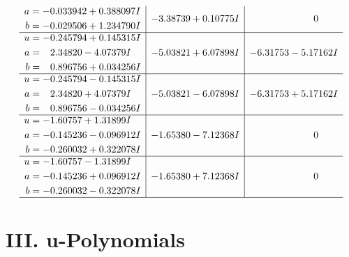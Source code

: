 \documentclass[1p]{elsarticle_modified}
\theoremstyle{definition}
\begin{document}
$$\begin{array}{c|c|c}
\begin{aligned}
a &= -0.033942 + 0.388097 I \\
b &= -0.029506 + 1.234790 I\end{aligned}
 & -3.38739 + 0.10775 I & \phantom{-0.000000 } 0 \\ \hline\begin{aligned}
u &= -0.245794 + 0.145315 I \\
a &= \phantom{-}2.34820 - 4.07379 I \\
b &= \phantom{-}0.896756 + 0.034256 I\end{aligned}
 & -5.03821 + 6.07898 I & -6.31753 - 5.17162 I \\ \hline\begin{aligned}
u &= -0.245794 - 0.145315 I \\
a &= \phantom{-}2.34820 + 4.07379 I \\
b &= \phantom{-}0.896756 - 0.034256 I\end{aligned}
 & -5.03821 - 6.07898 I & -6.31753 + 5.17162 I \\ \hline\begin{aligned}
u &= -1.60757 + 1.31899 I \\
a &= -0.145236 - 0.096912 I \\
b &= -0.260032 + 0.322078 I\end{aligned}
 & -1.65380 - 7.12368 I & \phantom{-0.000000 } 0 \\ \hline\begin{aligned}
u &= -1.60757 - 1.31899 I \\
a &= -0.145236 + 0.096912 I \\
b &= -0.260032 - 0.322078 I\end{aligned}
 & -1.65380 + 7.12368 I & \phantom{-0.000000 } 0\\
 \hline 
 \end{array}$$\newpage
\newpage\renewcommand{\arraystretch}{1}
\centering \section*{ III. u-Polynomials}
\end{document}
